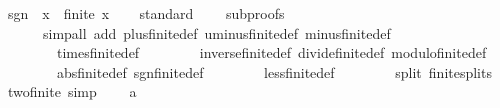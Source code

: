 \begin{isabellebody}
\isamarkupfalse%
\ {\isachardoublequoteopen}sgn\ {\isacharequal}{\kern0pt}\ {\isacharparenleft}{\kern0pt}{\isasymlambda}x\ {\isacharcolon}{\kern0pt}{\isacharcolon}{\kern0pt}\ finite{\isacharunderscore}{\kern0pt}{}{\isachardot}{\kern0pt}\ x{\isacharparenright}{\kern0pt}{\isachardoublequoteclose}\isanewline
{}\isamarkupfalse%
\isanewline
%
\isadelimproof
\ \ %
\endisadelimproof
%
\isatagproof
{}\isamarkupfalse%
\ standard\isanewline
\ \ \ \ {\isacharparenleft}{\kern0pt}subproofs\isanewline
\ \ \ \ \ \ {\isacartoucheopen}simp{\isacharunderscore}{\kern0pt}all\ add{\isacharcolon}{\kern0pt}\ plus{\isacharunderscore}{\kern0pt}finite{\isacharunderscore}{\kern0pt}{}{\isacharunderscore}{\kern0pt}def\ uminus{\isacharunderscore}{\kern0pt}finite{\isacharunderscore}{\kern0pt}{}{\isacharunderscore}{\kern0pt}def\ minus{\isacharunderscore}{\kern0pt}finite{\isacharunderscore}{\kern0pt}{}{\isacharunderscore}{\kern0pt}def\isanewline
\ \ \ \ \ \ \ \ times{\isacharunderscore}{\kern0pt}finite{\isacharunderscore}{\kern0pt}{}{\isacharunderscore}{\kern0pt}def\isanewline
\ \ \ \ \ \ \ \ inverse{\isacharunderscore}{\kern0pt}finite{\isacharunderscore}{\kern0pt}{}{\isacharunderscore}{\kern0pt}def\ divide{\isacharunderscore}{\kern0pt}finite{\isacharunderscore}{\kern0pt}{}{\isacharunderscore}{\kern0pt}def\ modulo{\isacharunderscore}{\kern0pt}finite{\isacharunderscore}{\kern0pt}{}{\isacharunderscore}{\kern0pt}def\isanewline
\ \ \ \ \ \ \ \ abs{\isacharunderscore}{\kern0pt}finite{\isacharunderscore}{\kern0pt}{}{\isacharunderscore}{\kern0pt}def\ sgn{\isacharunderscore}{\kern0pt}finite{\isacharunderscore}{\kern0pt}{}{\isacharunderscore}{\kern0pt}def\isanewline
\ \ \ \ \ \ \ \ less{\isacharunderscore}{\kern0pt}finite{\isacharunderscore}{\kern0pt}{}{\isacharunderscore}{\kern0pt}def\isanewline
\ \ \ \ \ \ \ \ split{\isacharcolon}{\kern0pt}\ finite{\isacharunderscore}{\kern0pt}{}{\isachardot}{\kern0pt}splits{\isacartoucheclose}{\isacharparenright}{\kern0pt}%
\endisatagproof
{\isafoldproof}%
%
\isadelimproof
\isanewline
%
\endisadelimproof
{}\isamarkupfalse%
\isanewline
\isanewline
{}\isamarkupfalse%
\ two{\isacharunderscore}{\kern0pt}finite{\isacharunderscore}{\kern0pt}{}\ {\isacharbrackleft}{\kern0pt}simp{\isacharbrackright}{\kern0pt}{\isacharcolon}{\kern0pt}\isanewline
\ \ {\isachardoublequoteopen}{}\ {\isacharequal}{\kern0pt}\ a\isanewline

\end{isabellebody}
